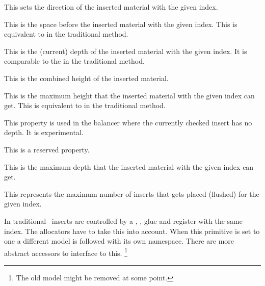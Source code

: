 This sets the direction of the inserted material with the given index.

\stopnewprimitive

\startnewprimitive[title={\prm {insertdistance}}]

This is the space before the inserted material with the given index. This is
equivalent to  in the traditional method.

\stopnewprimitive

\startnewprimitive[title={\prm {insertheight}}]

This is the (current) depth of the inserted material with the given index. It is
comparable to the  in the traditional method.

\stopnewprimitive

\startnewprimitive[title={\prm {insertheights}}]

This is the combined height of the inserted material.

\stopnewprimitive

\startnewprimitive[title={\prm {insertlimit}}]

This is the maximum height that the inserted material with the given index can
get. This is equivalent to  in the traditional method.

\stopnewprimitive

\startnewprimitive[title={\prm {insertlinedepth}}]

This property is used in the balancer where the currently checked insert has no
depth. It is experimental.

\stopnewprimitive

\startnewprimitive[title={\prm {insertlineheight}}]

This is a reserved property.

\stopnewprimitive

\startnewprimitive[title={\prm {insertmaxdepth}}]

This is the maximum depth that the inserted material with the given index can
get.

\stopnewprimitive

\startnewprimitive[title={\prm {insertmaxplaced}}]

This represents the maximum number of inserts that gets placed (flushed) for the
given index.

\stopnewprimitive

\startnewprimitive[title={\prm {insertmode}}]

In traditional \TEX\ inserts are controlled by a , , \prm
{glue} and  register with the same index. The allocators have to take
this into account. When this primitive is set to one a different model is
followed with its own namespace. There are more abstract accessors to interface
to this. \footnote {The old model might be removed at some point.}

